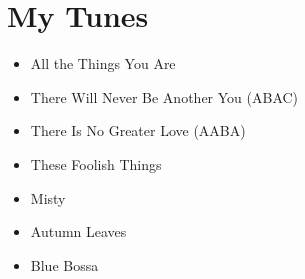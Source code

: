 \documentclass[10pt,a4paper]{article}
\begin{document}
\section{My Tunes}

\begin{itemize}
    \item All the Things You Are
    \item There Will Never Be Another You (ABAC)
    \item There Is No Greater Love (AABA)
    \item These Foolish Things
    \item Misty
    \item Autumn Leaves
    \item Blue Bossa
\end{itemize}
\end{document}
